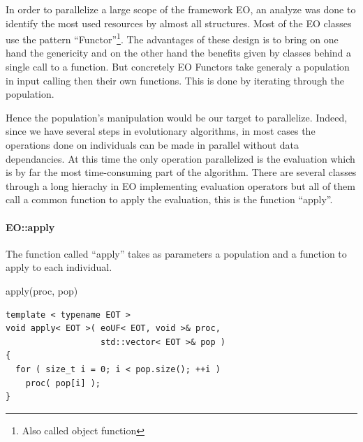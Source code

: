 \documentclass{sig-alternate}
\begin{document}

In order to parallelize a large scope of the framework EO, an analyze was done to identify the most used resources by almost all structures. Most of the EO classes use the pattern ``Functor''\footnote{Also called object function}. The advantages of these design is to bring on one hand the genericity and on the other hand the benefits given by classes behind a single call to a function. But concretely EO Functors take generaly a population in input calling then their own functions. This is done by iterating through the population.

Hence the population's manipulation would be our target to parallelize. Indeed, since we have several steps in evolutionary algorithms, in most cases the operations done on individuals can be made in parallel without data dependancies. At this time the only operation parallelized is the evaluation which is by far the most time-consuming part of the algorithm. There are several classes through a long hierachy in EO implementing evaluation operators but all of them call a common function to apply the evaluation, this is the function ``apply''.

\paragraph{EO::apply} %
The function called ``apply'' takes as parameters a population and a function to apply to each individual.


\vspace{-0.2cm}
\begin{algorithm}[h!]
\caption{apply(proc, pop)}
\vspace{0.2cm}
\begin{verbatim}
template < typename EOT >
void apply< EOT >( eoUF< EOT, void >& proc,
                   std::vector< EOT >& pop )
{
  for ( size_t i = 0; i < pop.size(); ++i )
    proc( pop[i] );
}
\end{verbatim}
\end{algorithm}
\vspace{-0.2cm}

\end{document}
